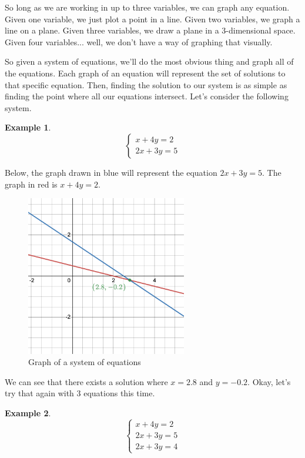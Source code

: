 \documentclass{scrbook}
\theoremstyle{definition}
\newtheorem{example}{Example}
\begin{document}
So long as we are working in up to three variables, we can graph any equation. Given one variable, we just plot a point in a line. Given two variables, we graph a line on a plane. Given three variables, we draw a plane in a 3-dimensional space. Given four variables... well, we don't have a way of graphing that visually. 

So given a system of equations, we'll do the most obvious thing and graph all of the equations. Each graph of an equation will represent the set of solutions to that specific equation. Then, finding the solution to our system is as simple as finding the point where all our equations intersect. Let's consider the following system.

\begin{example}
  \[
    \begin{cases}
      x + 4y = 2\\
      2x + 3y = 5
    \end{cases}
  \]
\end{example}

Below, the graph drawn in blue will represent the equation $2x + 3y = 5$. The graph in red is $x + 4y = 2$. 

\begin{figure}[H]
  \includegraphics[width=7cm]{system-of-eqs.png}
  \centering
  \caption{Graph of a system of equations}
\end{figure}

We can see that there exists a solution where $x=2.8$ and $y = -0.2$. Okay, let's try that again with 3 equations this time. 

\begin{example}
  \[
    \begin{cases}
      x + 4y = 2\\
      2x + 3y = 5\\
      2x + 3y = 4
    \end{cases}
  \]
\end{example}
\end{document}
